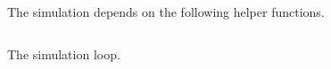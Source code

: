 The simulation depends on the following helper functions.
\begin{landscape}
\inputminted[fontsize=\footnotesize,linenos]{python}{python3_lib_simulation__helper_functions.py}
\end{landscape}

\begin{landscape}
The simulation loop.
\inputminted[fontsize=\footnotesize,linenos]{python}{python3_lib_simulation__simulate.py}
\end{landscape}
